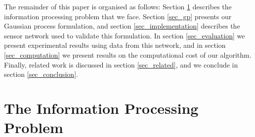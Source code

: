 \documentclass{acmtrans2m}
\begin{document}
The remainder of this paper is organised as follows: Section \ref{sec_info} describes the information processing problem that we face. Section \ref{sec_gp} presents our Gaussian process formulation, and section \ref{sec_implementation} describes the sensor network used to validate this formulation. In section \ref{sec_evaluation} we present experimental results using data from this network, and in section \ref{sec_computation} we present results on the computational cost of our algorithm. Finally, related work is discussed in section \ref{sec_related}, and we conclude in section \ref{sec_conclusion}.

\section{The Information Processing Problem}\label{sec_info}
\end{document}
